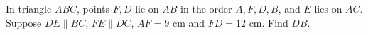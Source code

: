 In triangle $ABC$, points $F,D$ lie on $AB$ in the order $A,F,D,B$, and $E$ lies on $AC$. Suppose $DE\parallel BC$, $FE\parallel DC$, $AF=9$ cm and $FD=12$ cm. Find $DB$.
